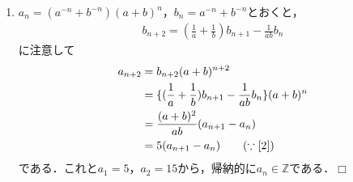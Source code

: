 \documentclass[a4j]{jarticle}
\begin{document}
\begin{multicols}{2}
\begin{enumerate}[(1)]
     \item $a_n=(a^{-n}+b^{-n})(a+b)^n$，$b_n=a^{-n}+b^{-n}$とおくと，
          \begin{align*}
          b_{n+2}=(\frac{1}{a}+\frac{1}{b})b_{n+1}-\frac{1}{ab}b_n
          \end{align*}
     に注意して
          \begin{align*} 
          a_{n+2}&=b_{n+2}(a+b)^{n+2} \\
          &=\{(\frac{1}{a}+\frac{1}{b})b_{n+1}-\frac{1}{ab}b_n\}(a+b)^n \\
          &=\frac{(a+b)^2}{ab}(a_{n+1}-a_n) \\
          &=5(a_{n+1}-a_n) \tag{$\because\eqref{2}$}
          \end{align*}
     である．これと$a_1=5$，$a_2=15$から，帰納的に$a_n\in\mathbb{Z}$である．$\Box$     
     \end{enumerate}     
\newpage
\end{multicols}
\end{document}
